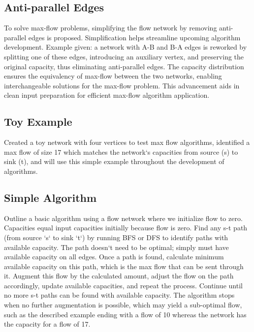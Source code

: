 \subsection*{Anti-parallel Edges}
To solve max-flow problems, simplifying the flow network by removing anti-parallel edges is proposed.
Simplification helps streamline upcoming algorithm development.
Example given: a network with A-B and B-A edges is reworked by splitting one of these edges, introducing an auxiliary vertex, and preserving the original capacity, thus eliminating anti-parallel edges.
The capacity distribution ensures the equivalency of max-flow between the two networks, enabling interchangeable solutions for the max-flow problem.
This advancement aids in clean input preparation for efficient max-flow algorithm application.

\subsection*{Toy Example}
Created a toy network with four vertices to test max flow algorithms, identified a max flow of size 17 which matches the network`s capacities from source (s) to sink (t), and will use this simple example throughout the development of algorithms.

\subsection*{Simple Algorithm}
Outline a basic algorithm using a flow network where we initialize flow to zero.
Capacities equal input capacities initially because flow is zero.
Find any s-t path (from source `s` to sink `t`) by running BFS or DFS to identify paths with available capacity.
The path doesn`t need to be optimal; simply must have available capacity on all edges.
Once a path is found, calculate minimum available capacity on this path, which is the max flow that can be sent through it.
Augment this flow by the calculated amount, adjust the flow on the path accordingly, update available capacities, and repeat the process.
Continue until no more s-t paths can be found with available capacity.
The algorithm stops when no further augmentation is possible, which may yield a sub-optimal flow, such as the described example ending with a flow of 10 whereas the network has the capacity for a flow of 17.

